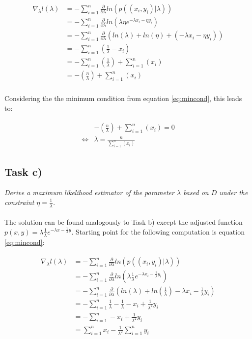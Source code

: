 \documentclass{article}
\begin{document}
\begin{align}
\begin{aligned}
\nabla_\lambda l(\lambda) & = - \sum_{i=1}^{n} \frac{\partial}{\partial \lambda} ln(p((x_i, y_i)|\lambda)) \\
					 & = - \sum_{i=1}^{n} \frac{\partial}{\partial \lambda} ln(\lambda\eta e ^ {- \lambda x_i - \eta y_i}) \\
					 & = - \sum_{i=1}^{n} \frac{\partial}{\partial \lambda} (ln(\lambda) + ln(\eta) + (- \lambda x_i - \eta y_i)) \\
					 & = - \sum_{i=1}^{n} (\frac{1}{\lambda} - x_i) \\
					 & = - \sum_{i=1}^{n} (\frac{1}{\lambda})  + \sum_{i=1}^{n}( x_i) \\
					 & = - (\frac{n}{\lambda})  + \sum_{i=1}^{n}( x_i) \\
\end{aligned}
\end{align}

Considering the the minimum condition from equation \ref{eq:mincond}, this leads to:

\begin{align}
\begin{aligned}
 			& - (\frac{n}{\lambda})  + \sum_{i=1}^{n}( x_i) 	= 0\\
 \Leftrightarrow  & \lambda =  \frac{n}{\sum_{i=1}^{n}( x_i)}
\end{aligned}
\end{align}

\subsection{Task c)}

\textit{Derive a maximum likelihood estimator of the parameter $\lambda$ based on $D$ under the constraint $\eta = \frac{1}{\lambda}$.}\\
\\
The solution can be found analogously to Task b) except the adjusted function $p(x, y) = \lambda\frac{1}{\lambda} e ^ {- \lambda x - \frac{1}{\lambda} y}$. Starting point for the following computation is equation \ref{eq:mincond}:

\begin{align}
\begin{aligned}
\nabla_\lambda l(\lambda) & = - \sum_{i=1}^{n} \frac{\partial}{\partial \lambda} ln(p((x_i, y_i)|\lambda))\\
					& = - \sum_{i=1}^{n} \frac{\partial}{\partial \lambda} ln(\lambda\frac{1}{\lambda} e ^ {- \lambda x_i - \frac{1}{\lambda} y_i})\\
					& = - \sum_{i=1}^{n} \frac{\partial}{\partial \lambda} (ln(\lambda) + ln(\frac{1}{\lambda}) - \lambda x_i - \frac{1}{\lambda} y_i)\\
					& = - \sum_{i=1}^{n} \frac{1}{\lambda}  - \frac{1}{\lambda} - x_i + \frac{1}{\lambda^2} y_i\\
					& = - \sum_{i=1}^{n} - x_i + \frac{1}{\lambda^2} y_i\\
					& = \sum_{i=1}^{n} x_i - \frac{1}{\lambda^2} \sum_{i=1}^{n} y_i\\
\end{aligned}
\end{align}
\end{document}
